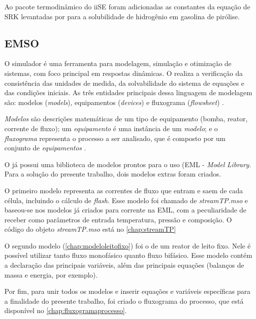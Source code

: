 Ao pacote termodinâmico do iiSE foram adicionadas as constantes da equação de
SRK levantadas por  para a solubilidade de hidrogênio em
gasolina de pirólise.

\subsection{EMSO} \label{sec:EMSO}

O simulador \emso{} é uma ferramenta para modelagem, simulação e otimização de
sistemas, com foco principal em respostas dinâmicas. O \emso realiza a
verificação da consistência das unidades de medida, da solvabilidade do sistema
de equações e das condições iniciais. As três entidades principais dessa
linguagem de modelagem são: modelos (\emph{models}), equipamentos
(\emph{devices}) e fluxograma (\emph{flowsheet}) \cite{Soares2003}.

\textit{Modelos} são descrições matemáticas de um tipo de equipamento (bomba,
reator, corrente de fluxo); um \textit{equipamento} é uma instância de um
\textit{modelo}; e o \textit{fluxograma} representa o processo a ser analisado,
que é composto por um conjunto de \textit{equipamentos} \cite{Soares2003}.

O \emso já possui uma biblioteca de modelos prontos para o uso (EML -
\emph{\emso  Model Library}. Para a solução do presente trabalho, dois modelos
extras foram criados.

O primeiro modelo representa as correntes de fluxo que entram e saem de
cada célula, incluindo o cálculo de \emph{flash}. Esse modelo foi chamado de
\emph{streamTP.mso} e baseou-se nos modelos já criados para corrente na EML, com
a peculiaridade de receber como parâmetros de entrada temperatura, pressão e
composição. O código do objeto \emph{streamTP.mso} está no
\autoref{chap:streamTP}

O segundo modelo (\autoref{chap:modeloleitofixo}) foi o de um reator de leito
fixo. Nele é possível utilizar tanto fluxo monofásico quanto fluxo bifásico.
Esse modelo contém a declaração das principais variáveis, além das principais
equações (balanços de massa e energia, por exemplo).

Por fim, para unir todos os modelos e inserir equações e variáveis
específicas para a finalidade do presente trabalho, foi criado o fluxograma do
processo, que está disponível no \autoref{chap:fluxogramaprocesso}.


